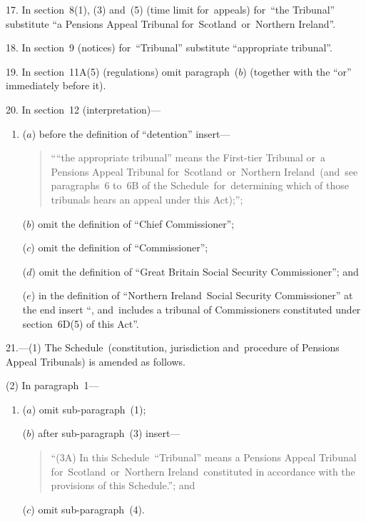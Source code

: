 \documentclass[12pt,a4paper]{article}
\begin{document}
\medskip

17.  In section~8(1), (3) and~(5) (time limit for~appeals) for~“the Tribunal” substitute “a Pensions Appeal Tribunal for~Scotland~or~Northern Ireland”.

\medskip

18.  In section~9 (notices) for~“Tribunal” substitute “appropriate tribunal”.

\medskip

19.  In section~11A(5) (regulations) omit paragraph~($b$)  (together with the “or” immediately before it).

\medskip

20.  In section~12 (interpretation)—
\begin{enumerate}\item[]
($a$) before the definition of “detention” insert—
\begin{quotation}
““the appropriate tribunal” means the First-tier Tribunal or~a Pensions Appeal Tribunal for~Scotland~or~Northern Ireland~(and~see paragraphs~6 to~6B of the Schedule~for~determining which of those tribunals hears an appeal under this Act);”;
\end{quotation}

($b$) omit the definition of “Chief Commissioner”;

($c$) omit the definition of “Commissioner”;

($d$) omit the definition of “Great Britain Social Security Commissioner”; and

($e$) in the definition of “Northern Ireland~Social Security Commissioner” at the end insert “, and~includes a tribunal of Commissioners constituted under section~6D(5) of this Act”.
\end{enumerate}

\medskip

21.---(1)  The Schedule~(constitution, jurisdiction and~procedure of Pensions Appeal Tribunals) is amended as follows.

(2) In paragraph~1—
\begin{enumerate}\item[]
($a$) omit sub-paragraph~(1);

($b$) after sub-paragraph~(3) insert—
\begin{quotation}
“(3A) In this Schedule~“Tribunal” means a Pensions Appeal Tribunal for~Scotland~or~Northern Ireland~constituted in accordance with the provisions of this Schedule.”; and
\end{quotation}

($c$) omit sub-paragraph~(4).
\end{enumerate}
\end{document}
